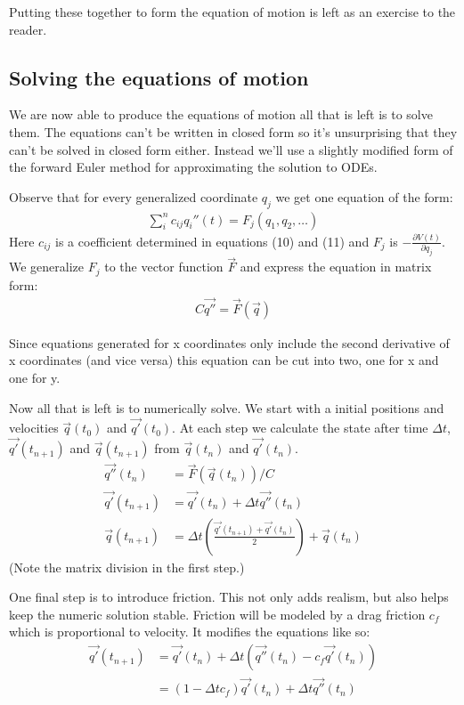 \documentclass{article}
\begin{document}
Putting these together to form the equation of motion is left as an exercise to
the reader.
\subsection{Solving the equations of motion}
We are now able to produce the equations of motion all that is left is to solve
them. The equations can't be written in closed form so it's unsurprising that
they can't be solved in closed form either. Instead we'll use a slightly
modified form of the forward Euler method for approximating the solution to ODEs.

Observe that for every generalized coordinate $q_j$ we get one equation of the
form:
\begin{align*}
\sum_i^n c_{ij}q_i''(t) = F_j(q_1,q_2,\ldots)
\end{align*}
Here $c_{ij}$ is a coefficient determined in equations (10) and (11) and $F_j$
is $-\frac{\partial V(t)}{\partial q_j}$. We generalize $F_j$ to the vector
function $\vec{F}$ and express the equation in matrix form:
\begin{align*}
C \vec{q''}= \vec{F}(\vec{q})
\end{align*}

Since equations generated for x coordinates only include the second derivative
of x coordinates (and vice versa) this equation can be cut into two, one for x
and one for y.

Now all that is left is to numerically solve. We start with a initial positions
and velocities $\vec{q}(t_0)$ and $\vec{q'}(t_0)$. At each step we calculate the
state after time $\Delta t$,  $\vec{q'}(t_{n+1})$ and $\vec{q}(t_{n+1})$ from
$\vec{q}(t_n)$ and $\vec{q'}(t_n)$.
\begin{align*}
\vec{q''}(t_n) &= \vec{F}(\vec{q}(t_n)) / C\\
\vec{q'}(t_{n+1}) &= \vec{q'}(t_n)+\Delta t \vec{q''}(t_n)\\
\vec{q}(t_{n+1}) &= \Delta t \left( \frac{\vec{q'}(t_{n+1}) + \vec{q'}(t_n)}{2}
\right)+ \vec{q}(t_n)
\end{align*}
(Note the matrix division in the first step.)

One final step is to introduce friction. This not only adds realism, but also
helps keep the numeric solution stable. Friction will be modeled by
a drag friction $c_f$ which is proportional to velocity. It modifies the
equations like so:
\begin{align*}
\vec{q'}(t_{n+1}) &= \vec{q'}(t_n)+\Delta t \left(\vec{q''}(t_n)
-c_f\vec{q'}(t_n)\right)\\
&= \left(1-\Delta t c_f\right)\vec{q'}(t_n)+\Delta t \vec{q''}(t_n)
\end{align*}
\end{document}
